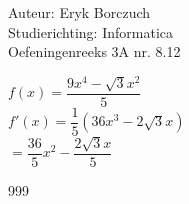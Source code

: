 \documentclass[a4paper]{article}
\begin{document}
  
\noindent \large Auteur: Eryk Borczuch \\
\noindent \large Studierichting: Informatica\\
\noindent \large Oefeningenreeks 3A nr. 8.12\\

\medskip

\normalsize

$f(x) = \dfrac{9x^4 - \sqrt{3} x^2}{5}$\\

$f'(x) = \dfrac{1}{5} (36x^3 - 2\sqrt{3}x)$\\

$= \dfrac{36}{5}x^2 - \dfrac{2\sqrt{3}x}{5}$

\begin{thebibliography}{999}
\end{thebibliography}
\end{document}
